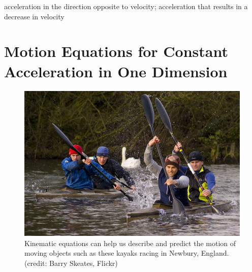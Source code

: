 \documentclass[
]{book}
\providecommand{\tightlist}{%
  \setlength{\itemsep}{0pt}\setlength{\parskip}{0pt}}
\begin{document}
\begin{description}
\tightlist
\item[deceleration]
acceleration in the direction opposite to velocity; acceleration
that results in a decrease in velocity
\end{description}

\hypertarget{motion-equations-for-constant-acceleration-in-one-dimension}{%
\section{Motion Equations for Constant Acceleration in One Dimension}\label{motion-equations-for-constant-acceleration-in-one-dimension}}

\begin{figure}
\hypertarget{import-auto-id1489960}{%
\centering
\includegraphics{images/Figure_02_05_00.jpg}
\caption{Kinematic equations can help us describe and predict the motion of
moving objects such as these kayaks racing in Newbury, England. (credit:
Barry Skeates,
Flickr)}\label{import-auto-id1489960}
}
\end{figure}
\end{document}
